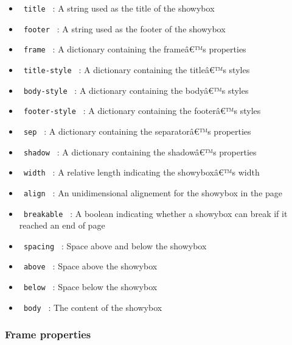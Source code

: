 \begin{itemize}
\tightlist
\item
  \texttt{\ title\ } : A string used as the title of the showybox
\item
  \texttt{\ footer\ } : A string used as the footer of the showybox
\item
  \texttt{\ frame\ } : A dictionary containing the frameâ€™s properties
\item
  \texttt{\ title-style\ } : A dictionary containing the titleâ€™s
  styles
\item
  \texttt{\ body-style\ } : A dictionary containing the bodyâ€™s styles
\item
  \texttt{\ footer-style\ } : A dictionary containing the footerâ€™s
  styles
\item
  \texttt{\ sep\ } : A dictionary containing the separatorâ€™s
  properties
\item
  \texttt{\ shadow\ } : A dictionary containing the shadowâ€™s
  properties
\item
  \texttt{\ width\ } : A relative length indicating the showyboxâ€™s
  width
\item
  \texttt{\ align\ } : An unidimensional alignement for the showybox in
  the page
\item
  \texttt{\ breakable\ } : A boolean indicating whether a showybox can
  break if it reached an end of page
\item
  \texttt{\ spacing\ } : Space above and below the showybox
\item
  \texttt{\ above\ } : Space above the showybox
\item
  \texttt{\ below\ } : Space below the showybox
\item
  \texttt{\ body\ } : The content of the showybox
\end{itemize}

\subsubsection{Frame properties}\label{frame-properties}


